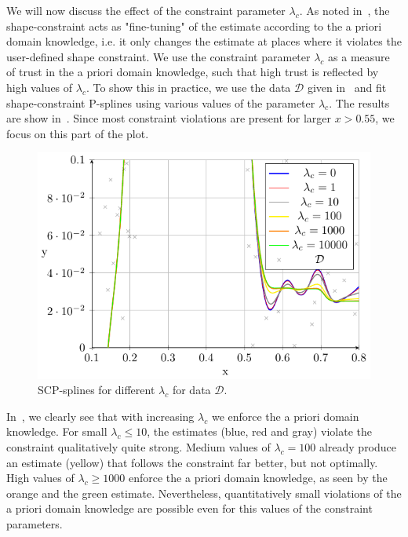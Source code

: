We will now discuss the effect of the constraint parameter $\lambda_c$. As noted in~, the shape-constraint acts as "fine-tuning" of the estimate according to the a priori domain knowledge, i.e. it only changes the estimate at places where it violates the user-defined shape constraint. We use the constraint parameter $\lambda_c$ as a measure of trust in the a priori domain knowledge, such that high trust is reflected by high values of $\lambda_c$. To show this in practice, we use the data $\mathcal{D}$ given in~ and fit shape-constraint P-splines using various values of the parameter $\lambda_c$. The results are show in~. Since most constraint violations are present for larger $x > 0.55$, we focus on this part of the plot. 

\begin{figure}[H]
	\centering
	\includegraphics{graphics/pgfplots/cha4/exp-lambdas.pdf}
	\caption{SCP-splines for different $\lambda_c$ for data $\mathcal{D}$.}
	\label{fig:example-lambdas}
\end{figure}	

In~, we clearly see that with increasing $\lambda_c$ we enforce the a priori domain knowledge. For small $\lambda_c \le 10$, the estimates (blue, red and gray) violate the constraint qualitatively quite strong. Medium values of $\lambda_c = 100$ already produce an estimate (yellow) that follows the constraint far better, but not optimally. High values of $\lambda_c \ge 1000$ enforce the a priori domain knowledge, as seen by the orange and the green estimate. Nevertheless, quantitatively small violations of the a priori domain knowledge are possible even for this values of the constraint parameters. 

